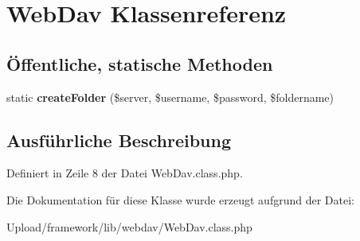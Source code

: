 \hypertarget{class_web_dav}{}\section{Web\+Dav Klassenreferenz}
\label{class_web_dav}
\subsection*{Öffentliche, statische Methoden}
\begin{DoxyCompactItemize}
\item 
\mbox{\label{class_web_dav_a41336f5cb03f535f1f9fb2a5f83a36e0}} 
static {\bfseries create\+Folder} (\$server, \$username, \$password, \$foldername)
\end{DoxyCompactItemize}


\subsection{Ausführliche Beschreibung}


Definiert in Zeile 8 der Datei Web\+Dav.\+class.\+php.



Die Dokumentation für diese Klasse wurde erzeugt aufgrund der Datei\+:\begin{DoxyCompactItemize}
\item 
Upload/framework/lib/webdav/Web\+Dav.\+class.\+php\end{DoxyCompactItemize}
